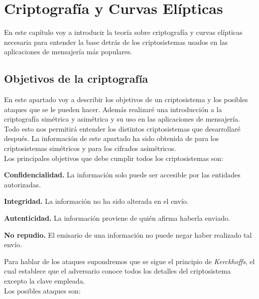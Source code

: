 \chapter{Criptografía y Curvas Elípticas}

En este capítulo voy a introducir la teoría sobre criptografía y curvas elípticas necesaria para entender la base detrás de los criptosistemas usados en las aplicaciones de mensajería más populares.

\section{Objetivos de la criptografía}
En este apartado voy a describir los objetivos de un criptosistema y los posibles ataques que se le pueden hacer. Además realizaré una introducción a la criptografía simétrica y asimétrica y su uso en las aplicaciones de mensajería. Todo esto nos permitirá entender los distintos criptosistemas que desarrollaré después.
La información de este apartado ha sido obtenida de \cite{apuntesCriptografia} para los criptosistemas simétricos y \cite{angelRiosMateos} para los cifrados asimétricos.\\
Los principales objetivos que debe cumplir todos los criptosistemas son:
\begin{description}
	\item \textbf{Confidencialidad.} 
		 La información solo puede ser accesible por las entidades autorizadas. 
	\item \textbf{Integridad.} 
		La información no ha sido alterada en el envío.
	\item \textbf{Autenticidad.} 
		La información proviene de quién afirma haberla enviado.
	\item \textbf{No repudio.}  
		El emisario de una información no puede negar haber realizado tal envío.
\end{description}
Para hablar de los ataques supondremos que se sigue el principio de \emph{Kerckhoffs}, el cual establece que el adversario conoce todos los detalles del criptosistema excepto la clave empleada.\\
Los posibles ataques son:
